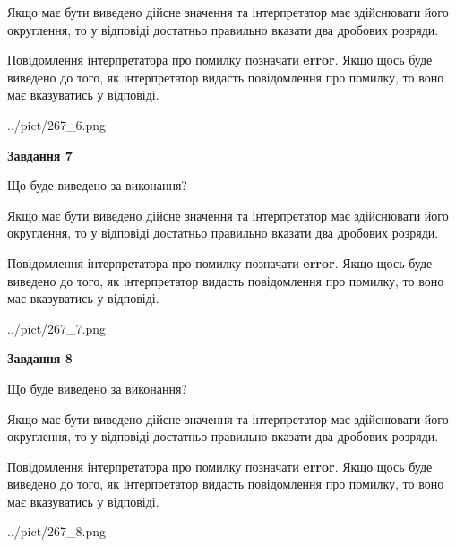 \documentclass[12pt, ukrainian]{article}
\begin{document}
{\begin {Large}
Якщо має бути виведено дійсне значення та інтерпретатор має здійснювати його округлення, 
то у відповіді достатньо правильно вказати два дробових розряди.

Повідомлення інтерпретатора про помилку позначати \textbf{error}.
Якщо щось буде виведено до того, як інтерпретатор видасть повідомлення про помилку, 
то воно має вказуватись у відповіді. \par

\begin{center}
	{../pict/267_6.png}
\end{center}
\newpage

{\begin {center}\textbf{Завдання 7}\end {center}}\par
Що буде виведено за виконання? \par

Якщо має бути виведено дійсне значення та інтерпретатор має здійснювати його округлення, 
то у відповіді достатньо правильно вказати два дробових розряди.

Повідомлення інтерпретатора про помилку позначати \textbf{error}.
Якщо щось буде виведено до того, як інтерпретатор видасть повідомлення про помилку, 
то воно має вказуватись у відповіді. \par

\begin{center}
	{../pict/267_7.png}
\end{center}
\newpage

{\begin {center}\textbf{Завдання 8}\end {center}}\par
Що буде виведено за виконання? \par

Якщо має бути виведено дійсне значення та інтерпретатор має здійснювати його округлення, 
то у відповіді достатньо правильно вказати два дробових розряди.

Повідомлення інтерпретатора про помилку позначати \textbf{error}.
Якщо щось буде виведено до того, як інтерпретатор видасть повідомлення про помилку, 
то воно має вказуватись у відповіді. \par

\begin{center}
	{../pict/267_8.png}
\end{center}
\newpage


\end{Large}}
\end{document}

